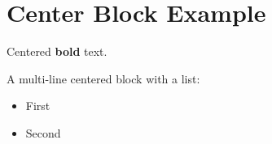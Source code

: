 \section{Center Block Example}\label{center-block-example}

\begin{center}

Centered \textbf{bold} text.

\end{center}

\begin{center}

A multi-line centered block with a list:

\begin{itemize}
\tightlist
\item
  First
\item
  Second
\end{itemize}

\end{center}
